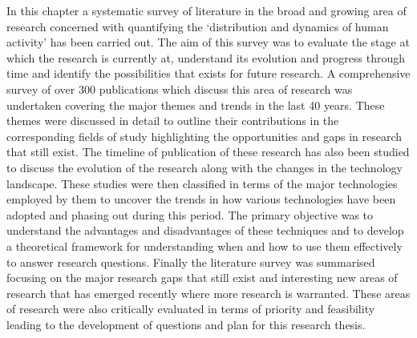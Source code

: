 In this chapter a systematic survey of literature in the broad and growing area of research concerned with quantifying the `distribution and dynamics of human activity' has been carried out.
The aim of this survey was to evaluate the stage at which the research is currently at, understand its evolution and progress through time and identify the possibilities that exists for future research.
A comprehensive survey of over 300 publications which discuss this area of research was undertaken covering the major themes and trends in the last 40 years.
These themes were discussed in detail to outline their contributions in the corresponding fields of study highlighting the opportunities and gaps in research that still exist.
The timeline of publication of these research has also been studied to discuss the evolution of the research along with the changes in the technology landscape.
These studies were then classified in terms of the major technologies employed by them to uncover the trends in how various technologies have been adopted and phasing out during this period.
The primary objective was to understand the advantages and disadvantages of these techniques and to develop a theoretical framework for understanding when and how to use them effectively to answer research questions.
Finally the literature survey was summarised focusing on the major research gaps that still exist and interesting new areas of research that has emerged recently  where more research is warranted.
These areas of research were also critically evaluated in terms of priority and feasibility leading to the development of questions and plan for this research thesis. 

